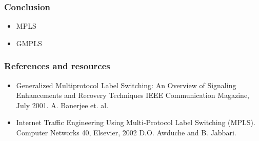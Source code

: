 \documentclass[12pt]{beamer}
\begin{document}
\begin{frame}
  \frametitle{Conclusion}
  \begin{itemize}
    \item MPLS
    \item GMPLS
  \end{itemize}
\end{frame}

\begin{frame}
  \frametitle{References and resources}
  \begin{itemize}
    \item Generalized Multiprotocol Label Switching: An Overview of Signaling Enhancements and Recovery Techniques
          IEEE Communication Magazine, July 2001.
          A. Banerjee et. al. 
    \item Internet Traffic Engineering Using Multi-Protocol Label Switching (MPLS).
          Computer Networks 40, Elsevier, 2002
          D.O. Awduche and B. Jabbari. 
  \end{itemize}
\end{frame}
\end{document}
